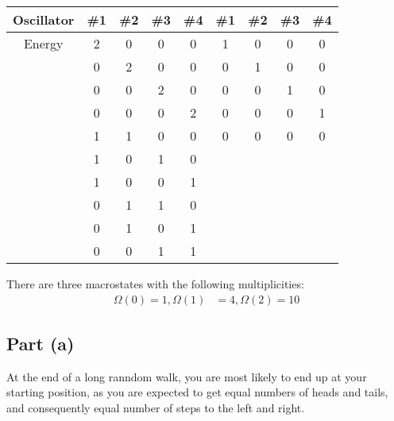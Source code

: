 \documentclass{article}
\begin{document}
\clearpage

\begin{center}
\begin{tabular}{|c|c|c|c|c||c|c|c|c|}
    \hline
    Oscillator & \#1 & \#2 & \#3 & \#4 & \#1 & \#2 & \#3 & \#4 \\
    \hline
    Energy & 2 & 0 & 0 & 0 & 1 & 0 & 0 & 0 \\
    \hline
     & 0 & 2 & 0 & 0 & 0 & 1 & 0 & 0 \\
    \hline
     & 0 & 0 & 2 & 0 & 0 & 0 & 1 & 0 \\
    \hline
     & 0 & 0 & 0 & 2 & 0 & 0 & 0 & 1 \\
    \hline
     & 1 & 1 & 0 & 0 & 0 & 0 & 0 & 0 \\
    \hline
     & 1 & 0 & 1 & 0 & & & & \\
    \hline
     & 1 & 0 & 0 & 1 & & & & \\
    \hline
     & 0 & 1 & 1 & 0 & & & & \\
    \hline
     & 0 & 1 & 0 & 1 & & & & \\
    \hline
     & 0 & 0 & 1 & 1 & & & & \\
     \hline
\end{tabular}
\end{center}

There are three macrostates with the following multiplicities:
\begin{equation}
    \begin{split}
        \Omega\left(0\right) = 1, \Omega\left(1\right) & = 4, \Omega\left(2\right) = 10
    \end{split}
\end{equation}

\clearpage

\subsection*{Part (a)}
At the end of a long ranndom walk, you are most likely to end up at your starting position, as you are expected to get equal numbers of heads and tails, and consequently equal number of steps to the left and right.
\end{document}
